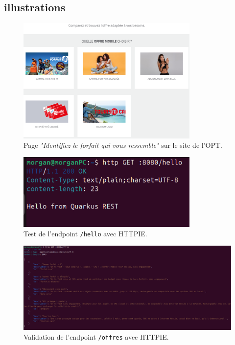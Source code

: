\documentclass{article}
\begin{document}
	\subsection{illustrations}
		\begin{figure}[H]
		\centering
		\includegraphics[width=0.8\textwidth]{asset/page_forfait.png}
		\caption{Page \textit{"Identifiez le forfait qui vous ressemble"} sur le site de l’OPT.}
		\label{fig:page_forfait}
	\end{figure}
	\begin{figure}[H]
		\centering
		\includegraphics[width=0.8\textwidth]{asset/hello.png}
		\caption{Test de l'endpoint \texttt{/hello} avec HTTPIE.}
		\label{fig:hello_endpoint}
	\end{figure}
	\begin{figure}[H]
		\centering
		\includegraphics[width=1\textwidth]{asset/endpoint offres.png}
		\caption{Validation de l'endpoint \texttt{/offres} avec HTTPIE.}
		\label{fig:offres_endpoint}
	\end{figure}
\end{document}
